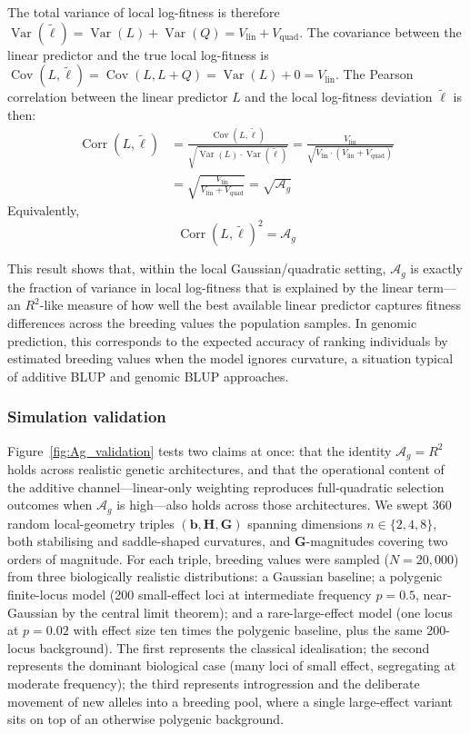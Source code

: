 \documentclass[9pt,twocolumn,twoside,lineno]{gsajnl}
\newcommand{\vect}[1]{\boldsymbol{#1}}
\newcommand{\mat}[1]{\mathbf{#1}}
\newcommand{\Ag}{\ensuremath{\mathcal{A}_{g}}\xspace}
\newcommand{\Vlin}{\ensuremath{V_{\text{lin}}}\xspace}
\newcommand{\Vquad}{\ensuremath{V_{\text{quad}}}\xspace}
\newcommand{\Var}{\ensuremath{\operatorname{Var}}\xspace}
\newcommand{\Cov}{\ensuremath{\operatorname{Cov}}\xspace}
\newcommand{\Corr}{\ensuremath{\operatorname{Corr}}\xspace}
\begin{document}
The total variance of local log-fitness is therefore $\Var(\tilde{\ell}) = \Var(L) + \Var(Q) = \Vlin + \Vquad$. The covariance between the linear predictor and the true local log-fitness is $\Cov(L, \tilde{\ell}) = \Cov(L, L+Q) = \Var(L) + 0 = \Vlin$. The Pearson correlation between the linear predictor $L$ and the local log-fitness deviation $\tilde{\ell}$ is then:
\begin{equation}
\begin{split}
\Corr(L, \tilde{\ell}) &= \frac{\Cov(L, \tilde{\ell})}{\sqrt{\Var(L) \cdot \Var(\tilde{\ell})}} = \frac{\Vlin}{\sqrt{\Vlin \cdot (\Vlin + \Vquad)}} \\[4pt]
&= \sqrt{\frac{\Vlin}{\Vlin + \Vquad}} = \sqrt{\Ag}
\end{split}
\end{equation}
Equivalently,
\begin{equation}
\Corr(L, \tilde{\ell})^2 = \Ag
\label{eq:Ag_as_R2}
\end{equation}

This result shows that, within the local Gaussian/quadratic setting, \Ag is exactly the fraction of variance in local log-fitness that is explained by the linear term---an $R^2$-like measure of how well the best available linear predictor captures fitness differences across the breeding values the population samples. In genomic prediction, this corresponds to the expected accuracy of ranking individuals by estimated breeding values when the model ignores curvature, a situation typical of additive BLUP and genomic BLUP approaches.

\subsubsection*{Simulation validation}

Figure~\ref{fig:Ag_validation} tests two claims at once: that the identity $\Ag = R^2$ holds across realistic genetic architectures, and that the operational content of the additive channel---linear-only weighting reproduces full-quadratic selection outcomes when $\Ag$ is high---also holds across those architectures. We swept 360 random local-geometry triples $(\vect{b}, \mat{H}, \mat{G})$ spanning dimensions $n \in \{2, 4, 8\}$, both stabilising and saddle-shaped curvatures, and $\mat{G}$-magnitudes covering two orders of magnitude. For each triple, breeding values were sampled ($N = 20{,}000$) from three biologically realistic distributions: a Gaussian baseline; a polygenic finite-locus model (200 small-effect loci at intermediate frequency $p = 0.5$, near-Gaussian by the central limit theorem); and a rare-large-effect model (one locus at $p = 0.02$ with effect size ten times the polygenic baseline, plus the same 200-locus background). The first represents the classical idealisation; the second represents the dominant biological case (many loci of small effect, segregating at moderate frequency); the third represents introgression and the deliberate movement of new alleles into a breeding pool, where a single large-effect variant sits on top of an otherwise polygenic background.
\end{document}
